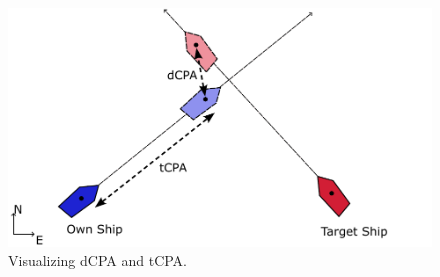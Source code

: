 \begin{figure}
    \centering
    \includegraphics[width=\textwidth]{Images/shipCPA.pdf}
    \caption{Visualizing dCPA and tCPA.}
    \label{FIG: ship CPA}
\end{figure}





